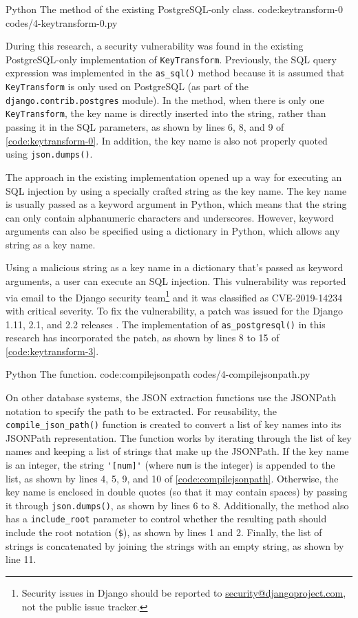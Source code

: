 \listing
{Python}
{The  method of the existing PostgreSQL-only  class.}
{code:keytransform-0}
{codes/4-keytransform-0.py}

During this research, a security vulnerability was found in the existing
PostgreSQL-only implementation of \verb|KeyTransform|. Previously, the SQL
query expression was implemented in the \verb|as_sql()| method because it is
assumed that \verb|KeyTransform| is only used on PostgreSQL (as part of the
\verb|django.contrib.postgres| module). In the method, when there is only one
\verb|KeyTransform|, the key name is directly inserted into the string, rather
than passing it in the SQL parameters, as shown by lines 6, 8, and 9 of
\autoref{code:keytransform-0}. In addition, the key name is also not properly
quoted using \verb|json.dumps()|.

The approach in the existing implementation opened up a way for executing an
SQL injection by using a specially crafted string as the key name. The key name
is usually passed as a keyword argument in Python, which means that the string
can only contain alphanumeric characters and underscores. However, keyword
arguments can also be specified using a dictionary in Python, which allows any
string as a key name.

Using a malicious string as a key name in a dictionary that's passed as keyword
arguments, a user can execute an SQL injection. This vulnerability was reported
via email to the Django security team\footnote{Security issues in Django should
be reported to
\href{mailto:security@djangoproject.com}{security@djangoproject.com}, not the
public issue tracker.} and it was classified as CVE-2019-14234 \cite{cve} with
critical severity. To fix the vulnerability, a patch was issued for the Django
1.11, 2.1, and 2.2 releases \cite{django:securityrelease}. The implementation
of \verb|as_postgresql()| in this research has incorporated the patch, as shown
by lines 8 to 15 of \autoref{code:keytransform-3}.

\listing
{Python}
{The  function.}
{code:compilejsonpath}
{codes/4-compilejsonpath.py}

On other database systems, the JSON extraction functions use the JSONPath
notation to specify the path to be extracted. For reusability, the
\verb|compile_json_path()| function is created to convert a list of key names
into its JSONPath representation. The function works by iterating through the
list of key names and keeping a list of strings that make up the JSONPath. If
the key name is an integer, the string \verb|'[num]'| (where \verb|num| is the
integer) is appended to the list, as shown by lines 4, 5, 9, and 10 of
\autoref{code:compilejsonpath}. Otherwise, the key name is enclosed in double
quotes (so that it may contain spaces) by passing it through
\verb|json.dumps()|, as shown by lines 6 to 8. Additionally, the method also
has a \verb|include_root| parameter to control whether the resulting path
should include the root notation (\verb|$|), as shown by lines 1 and 2.
Finally, the list of strings is concatenated by joining the strings with an
empty string, as shown by line 11.

